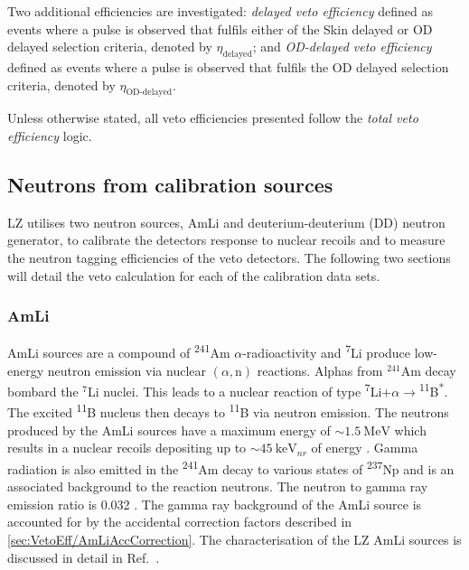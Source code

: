 Two additional efficiencies are investigated: \textit{delayed veto efficiency} defined as events where a pulse is observed that fulfils either of the Skin delayed or OD delayed selection criteria, denoted by $\eta_\text{delayed}$; and \textit{OD-delayed veto efficiency} defined as events where a pulse is observed that fulfils the OD delayed selection criteria, denoted by $\eta_\text{OD-delayed}$.

Unless otherwise stated, all veto efficiencies presented follow the \textit{total veto efficiency} logic.

\subsection{Neutrons from calibration sources}\label{sec:VetoEff/NeutronsFromCalibrationSources}
LZ utilises two neutron sources, AmLi and deuterium-deuterium (DD) neutron generator, to calibrate the detectors response to nuclear recoils and to measure the neutron tagging efficiencies of the veto detectors. The following two sections will detail the veto calculation for each of the calibration data sets.

\subsubsection{AmLi}\label{sec:VetoEff/AmLi_Efficiency}
AmLi sources are a compound of \textsuperscript{241}Am $\alpha$-radioactivity and \textsuperscript{7}Li produce low-energy neutron emission via nuclear $(\alpha,\text{n})$ reactions. Alphas from $^{241}$Am decay bombard the $^{7}$Li nuclei. This leads to a nuclear reaction of type \textsuperscript{7}Li$+\alpha \rightarrow$\textsuperscript{11}B\textsuperscript{*}. The excited \textsuperscript{11}B nucleus then decays to \textsuperscript{11}B via neutron emission. The neutrons produced by the AmLi sources have a maximum energy of $\sim1.5~\text{MeV}$ which results in a nuclear recoils depositing up to $\sim45~\text{keV}_{nr}$ of energy \cite{LZ:2024bsz}. Gamma radiation is also emitted in the \textsuperscript{241}Am decay to various states of \textsuperscript{237}Np and is an associated background to the reaction neutrons. The neutron to gamma ray emission ratio is 0.032 \cite{Sazzad:2023uqs}. The gamma ray background of the AmLi source is accounted for by the accidental correction factors described in \autoref{sec:VetoEff/AmLiAccCorrection}. The characterisation of the LZ AmLi sources is discussed in detail in Ref.~\cite{Sazzad:2023uqs}.

